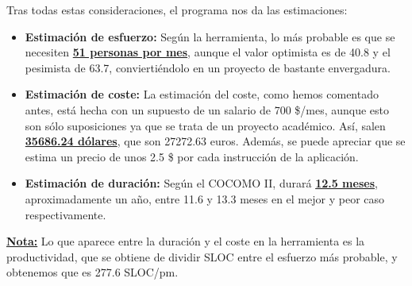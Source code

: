\documentclass[spanish,a4paper,11pt, twoside]{report}	%
\begin{document}
\vspace{0.35cm}
\hspace{-2.8cm}
\vspace{0.35cm}

Tras todas estas consideraciones, el programa nos da las estimaciones:

\vspace{0.35cm}
\hspace{-2.7cm}
\vspace{0.35cm}

\begin{itemize}
	\item{\bfseries{Estimación de esfuerzo:}}
	Según la herramienta, lo más probable es que se necesiten \textbf{\underline{51 personas por mes}}, aunque el valor optimista es de 40.8 y el pesimista de 63.7, conviertiéndolo en un proyecto de bastante envergadura.
	\item{\bfseries{Estimación de coste:}}
	La estimación del coste, como hemos comentado antes, está hecha con un supuesto de un salario de 700 \$/mes, aunque esto son sólo suposiciones ya que se trata de un proyecto académico. Así, salen \textbf{\underline{35686.24 dólares}}, que son 27272.63 euros. Además, se puede apreciar que se estima un precio de unos 2.5 \$ por cada instrucción de la aplicación.
	\item{\bfseries{Estimación de duración:}}
	Según el COCOMO II, durará \textbf{\underline{12.5 meses}}, aproximadamente un año, entre 11.6 y 13.3 meses en el mejor y peor caso respectivamente.
\end{itemize}

\textbf{\underline{Nota:}} Lo que aparece entre la duración y el coste en la herramienta es la productividad, que se obtiene de dividir SLOC entre el esfuerzo más probable, y obtenemos que es 277.6 SLOC/pm.

\newpage
\mbox{}
\thispagestyle{empty}						%
\newpage
\end{document}
